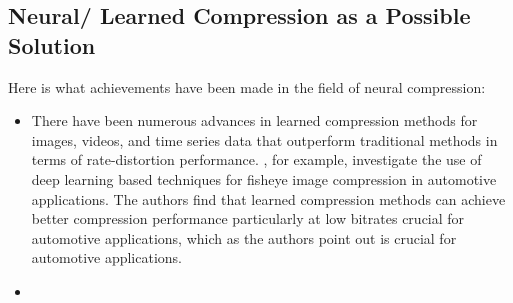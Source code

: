 \subsection{Neural/ Learned Compression as a Possible Solution}
Here is what achievements have been made in the field of neural compression:
\begin{itemize}
    \item There have been numerous advances in learned compression methods for images, videos, and time series data that outperform traditional methods in terms of rate-distortion performance. \cite{barakat2025fisheye}, for example, investigate the use of deep learning based techniques for fisheye image compression in automotive applications. The authors find that learned compression methods can achieve better compression performance particularly at low bitrates crucial for automotive applications, which as the authors point out is crucial for automotive applications.
    \item 
\end{itemize}
